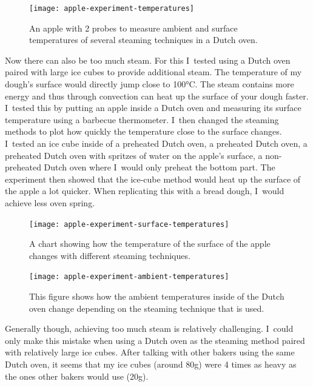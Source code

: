 \begin{figure}
  \texttt{[image: apple-experiment-temperatures]}
  \caption{An apple with 2 probes to measure ambient
  and surface temperatures of several steaming techniques
  in a Dutch oven.}%
  \label{apple-experiment-temperatures}
\end{figure}

Now there can also be too much steam. For this I~tested using a Dutch oven paired with large ice
cubes to provide additional steam. The temperature of my dough's surface would directly
jump close to 100°C. The steam contains more energy and thus through convection
can heat up the surface of your dough faster. I~tested this by putting an apple inside
a Dutch oven and measuring its surface temperature using a barbecue thermometer.
I~then changed the steaming methods to plot how quickly the temperature
close to the surface changes. I~tested an ice cube inside of a preheated
Dutch oven, a preheated Dutch oven, a preheated Dutch oven with spritzes
of water on the apple's surface, a non-preheated Dutch oven where I~would only preheat
the bottom part. The experiment then showed that the ice-cube method would heat up
the surface of the apple a lot quicker. When replicating this with a bread dough,
I~would achieve less oven spring.

\begin{figure}[h]
  \texttt{[image: apple-experiment-surface-temperatures]}
  \caption{A chart showing how the temperature of the surface
  of the apple changes with different steaming techniques.}%
  \label{apple-experiment-surface-temperatures}
\end{figure}

\begin{figure}[h]
  \texttt{[image: apple-experiment-ambient-temperatures]}
  \caption{This figure shows how the ambient temperatures inside of the
  Dutch oven change depending on the steaming technique that is used.}%
  \label{apple-experiment-ambient-temperatures}
\end{figure}

Generally though, achieving too much steam is relatively challenging. I~could only
make this mistake when using a Dutch oven as the steaming method paired with relatively
large ice cubes. After talking with other bakers using the same Dutch oven, it seems
that my ice cubes (around 80g) were 4 times as heavy as the ones other bakers
would use (20g).
